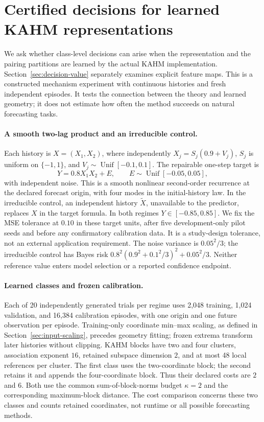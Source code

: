 \section{Certified decisions for learned KAHM representations}
\label{sec:learned-kahm-decision}

We ask whether class-level decisions can arise when the representation and
the pairing partitions are learned by the actual KAHM implementation.
Section~\ref{sec:decision-value} separately examines explicit feature maps.
This is a constructed mechanism experiment with continuous histories and fresh
independent episodes. It tests the connection between the theory and learned
geometry; it does not estimate how often the method succeeds on natural
forecasting tasks.

\paragraph{A smooth two-lag product and an irreducible control.}
Each history is $X=(X_1,X_2)$, where independently
$X_j=S_j(0.9+V_j)$, $S_j$ is uniform on $\{-1,1\}$, and
$V_j\sim\operatorname{Unif}[-0.1,0.1]$. The repairable one-step target is
\[
 Y=0.8X_1X_2+E,\qquad E\sim\operatorname{Unif}[-0.05,0.05],
\]
with independent noise. This is a smooth nonlinear second-order recurrence
at the declared forecast origin, with four modes in the initial-history law.
In the irreducible control, an independent history $\widetilde X$, unavailable
to the predictor, replaces $X$ in the target formula. In both regimes
$Y\in[-0.85,0.85]$. We fix the MSE tolerance at $0.10$ in these target units,
after five development-only pilot seeds and before any confirmatory
calibration data. It is a study-design tolerance, not an external application
requirement. The noise variance is $0.05^2/3$; the irreducible control has
Bayes risk $0.8^2(0.9^2+0.1^2/3)^2+0.05^2/3$. Neither reference value enters
model selection or a reported confidence endpoint.

\paragraph{Learned classes and frozen calibration.}
Each of 20 independently generated trials per regime uses 2,048 training,
1,024 validation, and 16,384 calibration episodes, with one origin and one
future observation per episode. Training-only coordinate min--max scaling,
as defined in Section~\ref{sec:input-scaling}, precedes geometry fitting;
frozen extrema transform later histories without clipping. KAHM blocks have
two and four clusters, association exponent $16$, retained subspace dimension
$2$, and at most 48 local references per cluster. The first class uses the
two-coordinate block; the second retains it and appends the four-coordinate
block. Thus their declared costs are $2$ and $6$. Both use the common
sum-of-block-norms budget $\kappa=2$ and the corresponding maximum-block
distance. The cost comparison concerns these two classes and counts retained
coordinates, not runtime or all possible forecasting methods.

